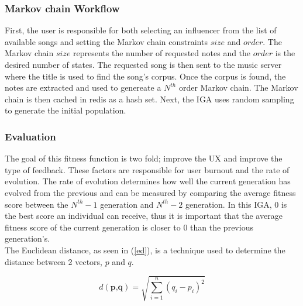 \documentclass[12pt]{article} %
\begin{document}
\subsubsection{Markov chain Workflow}
First, the user is responsible for both selecting an influencer from the list of available songs and setting the Markov chain constraints $size$ and $order$. The Markov chain $size$ represents the number of requested notes and the $order$ is the desired number of states. The requested song is then sent to the music server where the title is used to find the song's corpus. Once the corpus is found, the notes are extracted and used to genereate a $N^{th}$ order Markov chain. The Markov chain is then cached in redis as a hash set. Next, the IGA uses random sampling to generate the initial population.



\subsubsection{Evaluation}
The goal of this fitness function is two fold; improve the UX and improve the type of feedback. These factors are responsible for user burnout and the rate of evolution. The rate of evolution determines how well the current generation has evolved from the previous and can be measured by comparing the average fitness score between the $N^{th}-1$ generation and $N^{th}-2$ generation. In this IGA, 0 is the best score an individual can receive, thus it is important that the average fitness score of the current generation is closer to 0 than the previous generation's.
\\
The Euclidean distance, as seen in (\ref{ed}), is a technique used to determine the distance between 2 vectors, $p$ and $q$. 

\begin{equation}
	d(\textbf{p,q}) = \sqrt{\sum_{i=1}^n (q_i - p_i)^2} 
	\label{ed}
\end{equation}
\end{document}

